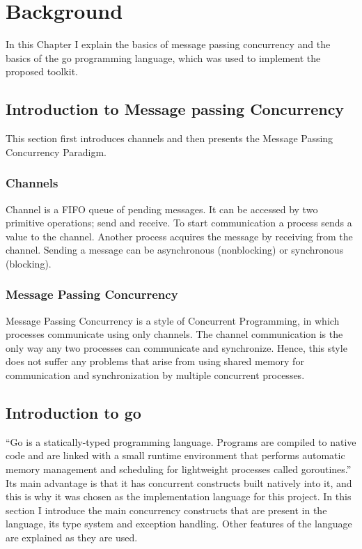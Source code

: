 \section{Background}
\label{sec:background}
In this Chapter I explain the basics of message passing concurrency and 
the basics of the go programming language, which was used to implement 
the proposed toolkit.

\subsection{Introduction to Message passing Concurrency}
This section first introduces channels and then presents the Message
Passing Concurrency Paradigm.

\subsubsection{Channels}
Channel is a FIFO queue of pending messages. It can be accessed by two
primitive operations; send and receive. To start communication
a process sends a value to the channel. Another process acquires the message
by receiving from the channel. Sending a message can be asynchronous (nonblocking)
or synchronous (blocking).~\cite[293]{book:foundations}

\subsubsection{Message Passing Concurrency}
Message Passing Concurrency is a style of Concurrent Programming, in which
processes communicate using only channels. The channel communication is 
the only way any two processes can communicate and synchronize. 
Hence, this style does not 
suffer any problems that arise from using shared memory for communication 
and synchronization by multiple concurrent processes.

\subsection{Introduction to go}
``Go is a statically-typed programming language. Programs are compiled 
to native code and are linked with a small runtime environment that performs 
automatic memory management and scheduling for lightweight processes called 
goroutines.''~\cite[2]{whitehead} Its main advantage is 
that it has concurrent constructs built natively into it,
and this is why it was chosen as the implementation language 
for this project.
In this section I introduce the main concurrency constructs that are
present in the language, its type system and exception handling. Other 
features of the language are explained as they are used.

